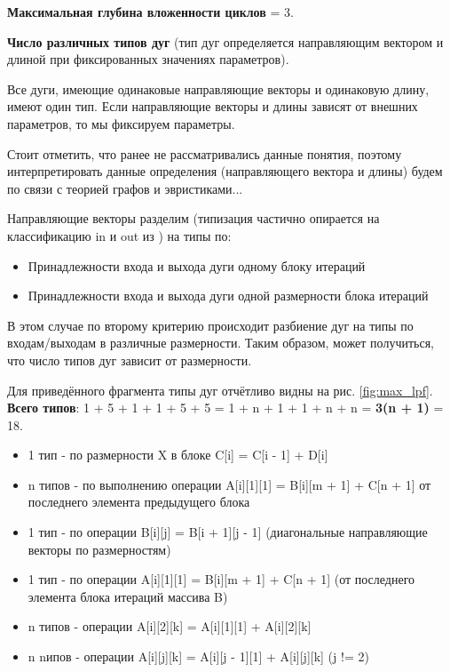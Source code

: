 \documentclass[12pt, fleqn]{article}
\theoremstyle{definition}
\newenvironment{packed_enum}{
\begin{enumerate}
  \setlength{\itemsep}{1pt}
  \setlength{\parskip}{0pt}
  \setlength{\parsep}{0pt}
}{\end{enumerate}}
\begin{document}
\begin{packed_enum}
 \item \textbf{Максимальная глубина вложенности циклов} = 3.

 \item \textbf{Число различных типов дуг} (тип дуг определяется направляющим вектором и длиной при фиксированных значениях параметров).
 
 Все дуги, имеющие одинаковые направляющие векторы и одинаковую длину, имеют один тип. Если направляющие векторы и длины зависят от внешних параметров, то мы фиксируем параметры.
 
 Стоит отметить, что ранее не рассматривались данные понятия, поэтому интерпретировать данные определения (направляющего вектора и длины) будем по связи с теорией графов и эвристиками...
 
 Направляющие векторы разделим (типизация частично опирается на классификацию in и out из \cite{Voevodin02}) на типы по: 
 \begin{itemize}
 \setlength{\itemsep}{1pt}
  \item Принадлежности входа и выхода дуги одному блоку итераций
  \item Принадлежности входа и выхода дуги одной размерности блока итераций
 \end{itemize} 

 
 В этом случае по второму критерию происходит разбиение дуг на типы по входам/выходам в различные размерности. Таким образом, может получиться, что число типов дуг зависит от размерности.
 
 Для приведённого фрагмента типы дуг отчётливо видны на рис. \ref{fig:max_lpf}. \textbf{Всего типов}: 1 + 5 + 1 + 1 + 5 + 5 = 1 + n + 1 + 1 + n + n = \textbf{3(n + 1)} = 18.
 
 \begin{itemize}
  \item 1 тип - по размерности X в блоке C[i] = C[i - 1] + D[i]
  \item n типов - по выполнению операции A[i][1][1] = B[i][m + 1] + C[n + 1] от последнего элемента предыдущего блока
  \item 1 тип - по операции B[i][j] = B[i + 1][j - 1] (диагональные направляющие векторы по размерностям)
  \item 1 тип - по операции A[i][1][1] = B[i][m + 1] + C[n + 1] (от последнего элемента блока итераций массива B)
  \item n типов - операции A[i][2][k] = A[i][1][1] + A[i][2][k]
  \item n nипов - операции A[i][j][k] = A[i][j - 1][1] + A[i][j][k] (j != 2)
 \end{itemize}


\end{packed_enum}
\end{document}
